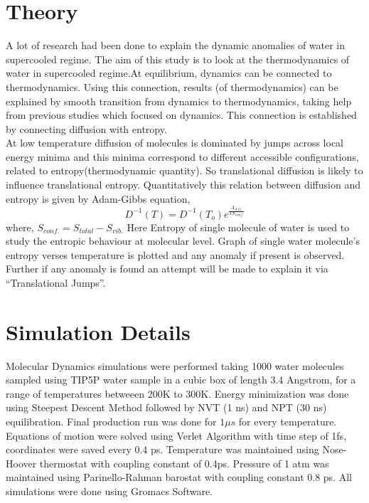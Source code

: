 \documentclass{article}[a4paper,12pt,twoside]
\begin{document}
\section{Theory}
A lot of research had been done to explain the dynamic anomalies of water in supercooled regime. The aim of this study is to look at the thermodynamics of water in supercooled
regime.At equilibrium, dynamics can be connected to thermodynamics. Using this connection, results (of thermodynamics) can be explained by smooth transition from dynamics to 
thermodynamics, taking help from previous studies which focused on dynamics. This connection is established by connecting diffusion with entropy.\\At low temperature diffusion 
of molecules is dominated by jumps across local energy minima and this minima correspond to different accessible configurations, related to entropy(thermodynamic quantity).
So translational diffusion is likely to influence translational entropy. Quantitatively this relation between diffusion and entropy is given by Adam-Gibbs equation, 
\begin{equation}
	D^{-1}(T)=D^{-1}(T_o) e^{\frac{A_{A.G.}}{TS_{conf.}}} 
\end{equation}
where, $S_{conf.}=S_{total}-S_{vib.}$
Here Entropy of single molecule of water is used to study the entropic behaviour at molecular level. Graph of single water molecule's entropy verses temperature is plotted
and any anomaly if present is observed. Further if any anomaly is found an attempt will be made to explain it via ``Translational Jumps''. 

\section{Simulation Details}
Molecular Dynamics simulations were performed taking 1000 water molecules sampled using TIP5P water sample in a cubic box of length 3.4 Angstrom, for a range of temperatures betweeen 200K to 300K. Energy minimization
was done using Steepest Descent Method followed by NVT (1 ns) and NPT (30 ns) equilibration. Final production run was done for $1 \mu s$ for every temperature. Equations of 
motion were solved using Verlet Algorithm with time step of 1fs, coordinates were saved every 0.4 ps. Temperature was maintained using Nose-Hoover thermostat with coupling 
constant of 0.4ps. Pressure of 1 atm was maintained using Parinello-Rahman barostat with coupling constant 0.8 ps. All simulations were done using Gromacs Software.
\end{document}
